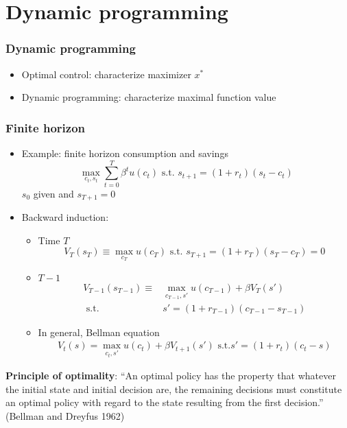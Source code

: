 \documentclass[compress]{beamer}
\begin{document}
\section{Dynamic programming}

\begin{frame}\frametitle{Dynamic programming}
  \begin{itemize}
  \item Optimal control: characterize maximizer $x^\ast$
  \item Dynamic programming: characterize maximal function value
  \end{itemize}
\end{frame}

\begin{frame}\frametitle{Finite horizon}
\begin{itemize}
\item Example: finite horizon consumption and savings
  \[ \max_{c_t,s_t} \sum_{t=0}^T \beta^t u(c_t) \text{ s.t. }
  s_{t+1} = (1+r_t) (s_t - c_t) \]
  $s_0$ given and $s_{T+1} = 0$
\item Backward induction:
  \begin{itemize}
  \item Time $T$
    \[ V_T(s_T) \equiv \max_{c_T} u(c_T) \text{ s.t. } s_{T+1} = (1+r_T)(s_T
    -c_T) = 0 \] 
  \item $T-1$
    \begin{align*}
      V_{T-1}(s_{T-1}) \equiv & \max_{c_{T-1},s'} u(c_{T-1}) + \beta
      V_T(s') \\
      \text{ s.t.} & s' =
    (1+r_{T-1})(c_{T-1}-s_{T-1}) 
  \end{align*}
\item In general, Bellman equation
    \begin{align} 
      V_t(s) = \max_{c_t,s'} u(c_{t}) + \beta V_{t+1}(s') \text{ s.t.} s' =
      (1+r_{t})(c_{t}-s)
    \end{align}
  \end{itemize}
\end{itemize}
\end{frame}

\begin{frame}
  \textbf{Principle of optimality}: 
  ``An optimal policy has the property that whatever the initial state
  and initial decision are, the remaining decisions must constitute an
  optimal policy with regard to the state resulting from the first
  decision.''  (Bellman and Dreyfus 1962) 
\end{frame}
\end{document}
